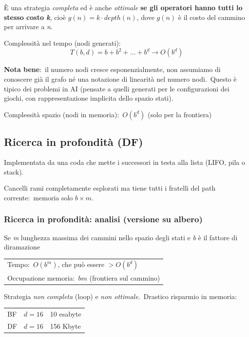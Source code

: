 \noindent È una strategia \textit{completa} ed è anche \textit{ottimale} \textbf{se gli operatori hanno tutti lo stesso costo \textit{k}}, cioè $g(n) = k \cdot depth(n)$, dove $g(n)$ è il costo del
cammino per arrivare a \textit{n}.
\begin{flushleft}
	Complessità nel tempo (nodi generati):
	\[T(b, d) = b + b^2 + \dots + b^d \rightarrow O(b^d)\]
\end{flushleft}

\noindent\textbf{Nota bene}:\ il numero nodi cresce esponenzialmente, non assumiamo di conoscere già il grafo né una notazione di linearità nel numero nodi.\
Questo è tipico dei problemi in AI (pensate a quelli generati per le configurazioni dei giochi, con rappresentazione implicita dello spazio stati).

\begin{flushleft}
	Complessità spazio (nodi in memoria):\ $O(b^d)$ (solo per la frontiera)

\end{flushleft}

\subsection{Ricerca in profondità (DF)}

Implementata da una coda che mette i successori in testa alla lista (LIFO, pila o stack).

Cancelli rami completamente esplorati ma tiene tutti i fratelli del path corrente:\ memoria solo $b \times m$.

\subsubsection{Ricerca in profondità: analisi (versione su albero)}

Se \textit{m} lunghezza massima dei cammini nello spazio degli stati e \textit{b} è il fattore di diramazione

\begin{table}[H]
	\centering
	\begin{tabular}{l}
		Tempo:\ $O(b^m)$, che può essere $> O(b^d)$        \\
		Occupazione memoria:\ $bm$ (frontiera sul cammino) \\
	\end{tabular}
\end{table}

\noindent Strategia \textit{non completa} (loop) e \textit{non ottimale}.\
Drastico risparmio in memoria:
\begin{table}[H]
	\centering
	\begin{tabular}{l l l}
		BF & $d=16$ & 10 esabyte \\
		DF & $d=16$ & 156 Kbyte  \\
	\end{tabular}
\end{table}

